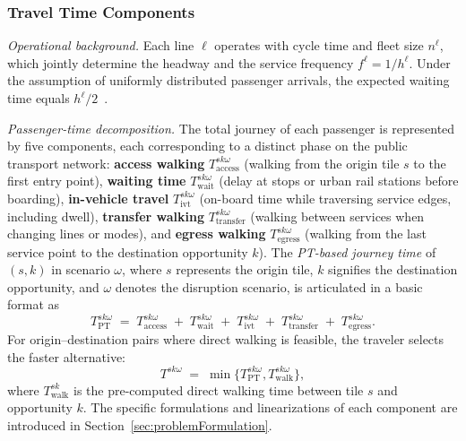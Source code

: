 \documentclass[3p,times,procedia]{elsarticle}
\begin{document}
\subsubsection{Travel Time Components}
\label{subsubsec:travel_time}

\textit{Operational background.} 
Each line $\ell$ operates with cycle time  and fleet size $n^\ell$, which jointly determine the headway  and the service frequency $f^\ell = 1/h^\ell$. Under the assumption of uniformly distributed passenger arrivals, the expected waiting time equals $h^\ell/2$~\citep{osuna1972control,pinto2020joint}. 

\textit{Passenger-time decomposition.}
The total journey of each passenger is represented by five components, each corresponding to a distinct phase on the public transport network: 
\textbf{access walking} $T^{sk\omega}_{\text{access}}$ (walking from the origin tile $s$ to the first entry point), 
\textbf{waiting time} $T^{sk\omega}_{\text{wait}}$ (delay at stops or urban rail stations before boarding),
\textbf{in-vehicle travel} $T^{sk\omega}_{\text{ivt}}$ (on-board time while traversing service edges, including dwell),
\textbf{transfer walking} $T^{sk\omega}_{\text{transfer}}$ (walking between services when changing lines or modes), and 
\textbf{egress walking} $T^{sk\omega}_{\text{egress}}$ (walking from the last service point to the destination opportunity $k$).
%
The \emph{PT-based journey time} of  $(s,k)$ in scenario $\omega$, where $s$ represents the origin tile, $k$ signifies the destination opportunity, and $\omega$ denotes the disruption scenario, is articulated in a basic format as
\begin{equation}
T^{sk\omega}_{\text{PT}}
\;=\;
T^{sk\omega}_{\text{access}}
\;+\;
T^{sk\omega}_{\text{wait}}
\;+\;
T^{sk\omega}_{\text{ivt}}
\;+\;
T^{sk\omega}_{\text{transfer}}
\;+\;
T^{sk\omega}_{\text{egress}} .
\label{eq:tt1_general}
\end{equation}
%
For origin--destination pairs where direct walking is feasible, the traveler selects the faster alternative:
\begin{equation}
T^{sk\omega} \;=\; \min \{T^{sk\omega}_{\text{PT}}, T^{sk\omega}_{\text{walk}}\},
\label{eq:tt1_walk}
\end{equation}
where $T^{sk}_{\text{walk}}$ is the pre-computed direct walking time between tile $s$ and opportunity $k$. The specific formulations and linearizations of each component are introduced in Section~\ref{sec:problemFormulation}.
\end{document}
